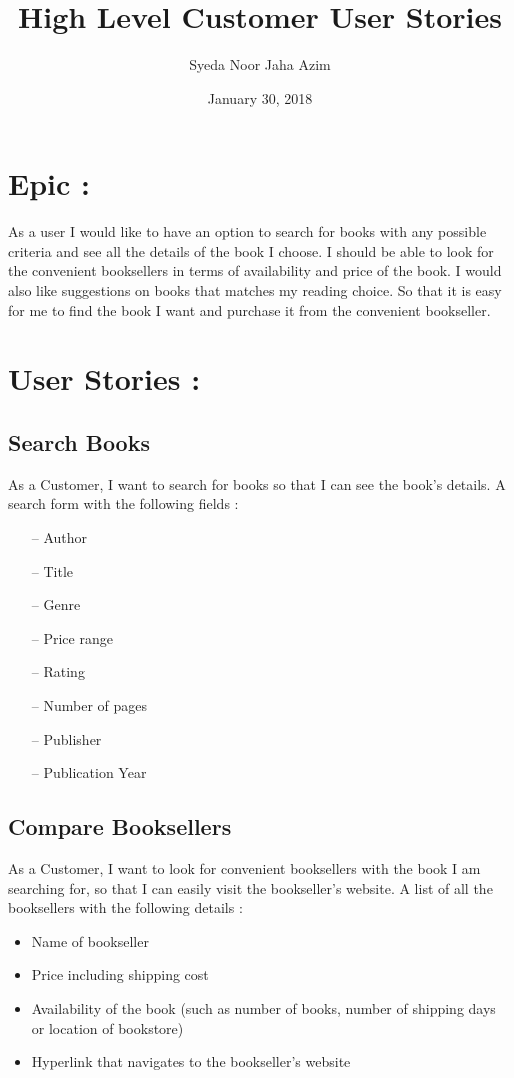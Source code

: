 \documentclass{article}
\title{High Level Customer User Stories}
\author{Syeda Noor Jaha Azim}
\date{January 30, 2018}
\begin{document}
\maketitle

\section{Epic : }
As a user I would like to have an option to search for books with any possible criteria and see all the details of the book I choose. I should be able to look for the convenient booksellers in terms of availability and price of the book. I would also like suggestions on books that matches my reading choice. So that it is easy for me to find the book I want and purchase it from the convenient bookseller. 

\section{User Stories : }
\subsection{Search Books}
As a Customer, I want to search for books so that I can see the book’s details.
\linebreak
\linebreak
 A search form with the following fields :
\begin{enumerate}
	\item[--] Author
	\item[--] Title
	\item[--] Genre
	\item[--] Price range
	\item[--] Rating
	\item[--] Number of pages
	\item[--] Publisher
	\item[--] Publication Year
\end{enumerate}

\subsection{Compare Booksellers}
As a Customer, I want to look for convenient booksellers with the book I am searching for, so that I can easily visit the bookseller’s website.
\linebreak
\linebreak
A list of all the booksellers with the following details :
\begin{itemize}
	\item  Name of bookseller
	\item Price including shipping cost
	\item Availability of the book (such as number of books, number of shipping days or location of bookstore)
	\item  Hyperlink that navigates to the bookseller’s website
\end{itemize}
\end{document}
